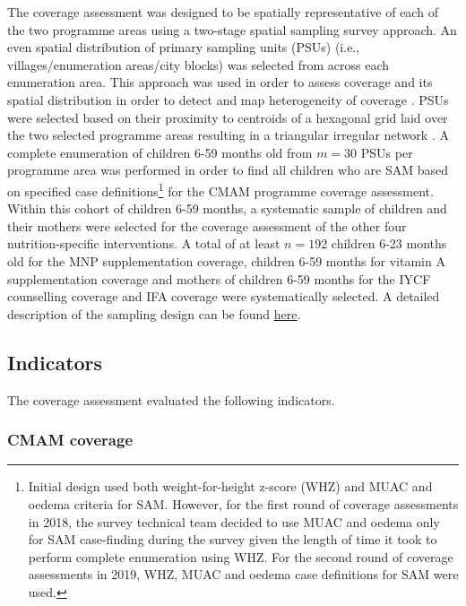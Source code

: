 \documentclass[12pt,a4paper]{article}
\begin{document}
The coverage assessment was designed to be spatially representative of each of the two programme areas using a two-stage spatial sampling survey approach. An even spatial distribution of primary sampling units (PSUs) (i.e., villages/enumeration areas/city blocks) was selected from across each enumeration area. This approach was used in order to assess coverage and its spatial distribution in order to detect and map heterogeneity of coverage \citep{Elliott:2004cg, Diggle:2014tk}. PSUs were selected based on their proximity to centroids of a hexagonal grid laid over the two selected programme areas resulting in a triangular irregular network \citep{Isaaks:1989uk, Elliot:2000vs}. A complete enumeration of children 6-59 months old from \(m = 30\) PSUs per programme area was performed in order to find all children who are SAM based on specified case definitions\footnote{Initial design used both weight-for-height z-score (WHZ) and MUAC and oedema criteria for SAM. However, for the first round of coverage assessments in 2018, the survey technical team decided to use MUAC and oedema only for SAM case-finding during the survey given the length of time it took to perform complete enumeration using WHZ. For the second round of coverage assessments in 2019, WHZ, MUAC and oedema case definitions for SAM were used.} for the CMAM programme coverage assessment. Within this cohort of children 6-59 months, a systematic sample of children and their mothers were selected for the coverage assessment of the other four nutrition-specific interventions. A total of at least \(n = 192\) children 6-23 months old for the MNP supplementation coverage, children 6-59 months for vitamin A supplementation coverage and mothers of children 6-59 months for the IYCF counselling coverage and IFA coverage were systematically selected. A detailed description of the sampling design can be found \href{https://validmeasures.org/liberiaS3M/}{here}.

\hypertarget{indicators}{%
\subsection{Indicators}\label{indicators}}

The coverage assessment evaluated the following indicators.

\hypertarget{cmam-coverage}{%
\subsubsection{CMAM coverage}\label{cmam-coverage}}
\end{document}
